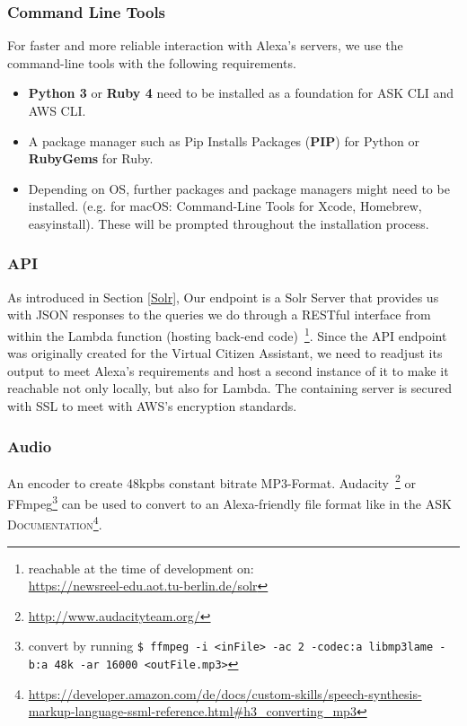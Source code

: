 \subsubsection*{Command Line Tools}
For faster and more reliable interaction with Alexa's servers, we use the command-line tools with the following requirements.
\begin{itemize}
\itemsep0em
\item \textbf{Python 3} or\textbf{ Ruby 4} need to be installed as a foundation for ASK CLI and AWS CLI.
\item  A package manager such as Pip Installs Packages (\textbf{PIP}) for Python or \textbf{RubyGems} for Ruby.
\item  Depending on OS, further packages and package managers might need to be installed. (e.g. for macOS: Command-Line Tools for Xcode, Homebrew, easyinstall). These will be prompted throughout the installation process.

\end{itemize}

	
\subsubsection*{API} 
As introduced in Section \ref{Solr}, Our endpoint is a Solr Server that provides us with JSON responses to the queries we do through a RESTful interface from within the Lambda function (hosting back-end code)~\footnote{reachable at the time of development on:\\\url{https://newsreel-edu.aot.tu-berlin.de/solr}}. Since the API endpoint was originally created for the Virtual Citizen Assistant, we need to readjust its output to meet Alexa's requirements and host a second instance of it to make it reachable not only locally, but also for Lambda. The containing server is secured with SSL to meet with AWS's encryption standards.

%
%




	
\subsubsection*{Audio} An encoder to create 48kpbs constant bitrate MP3-Format. Audacity~\footnote{\url{http://www.audacityteam.org/}} or FFmpeg\footnote{convert by running \lstinline|$ ffmpeg -i <inFile> -ac 2 -codec:a libmp3lame -b:a 48k -ar 16000 <outFile.mp3>|} can be used to convert to an Alexa-friendly file format like in the \textsc{ASK Documentation}\footnote{\url{https://developer.amazon.com/de/docs/custom-skills/speech-synthesis-markup-language-ssml-reference.html\#h3_converting_mp3}}.
	


